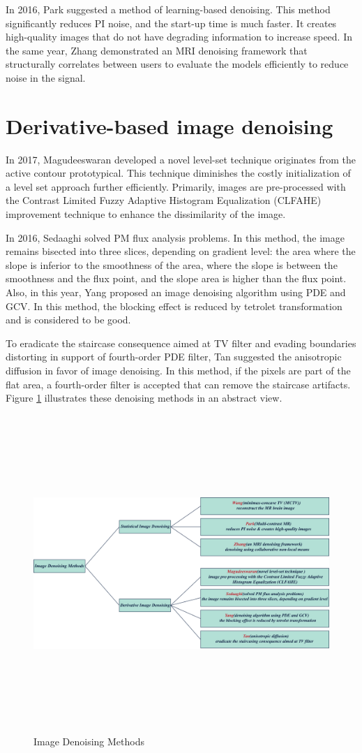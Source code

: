 In 2016, Park suggested a method of learning-based denoising. This method significantly reduces PI noise, and the start-up time is much faster. It creates high-quality images that do not have degrading information to increase speed. In the same year, Zhang demonstrated an MRI denoising framework that structurally correlates between users to evaluate the models efficiently to reduce noise in the signal.

\section{Derivative-based image denoising}
In 2017, Magudeeswaran developed a novel level-set technique originates from the active contour prototypical. This technique diminishes the costly initialization of a level set approach further efficiently. Primarily, images are pre-processed with the Contrast Limited Fuzzy Adaptive Histogram Equalization (CLFAHE) improvement technique to enhance the dissimilarity of the image.

In 2016, Sedaaghi solved PM flux analysis problems. In this method, the image remains bisected into three slices, depending on gradient level: the area where the slope is inferior to the smoothness of the area, where the slope is between the smoothness and the flux point, and the slope area is higher than the flux point. Also, in this year, Yang proposed an image denoising algorithm using PDE and GCV. In this method, the blocking effect is reduced by tetrolet transformation and is considered to be good.

To eradicate the staircase consequence aimed at TV filter and evading boundaries distorting in support of fourth-order PDE filter, Tan suggested the anisotropic diffusion in favor of image denoising. In this method, if the pixels are part of the flat area, a fourth-order filter is accepted that can remove the staircase artifacts. Figure \ref{fig24} illustrates these denoising methods in an abstract view.

\begin{figure}[htbp]
	\centering \includegraphics[width=1\columnwidth,height=12cm]{./figures/Fig24.png}
	\caption{Image Denoising Methods}
	\label{fig24}
\end{figure}
